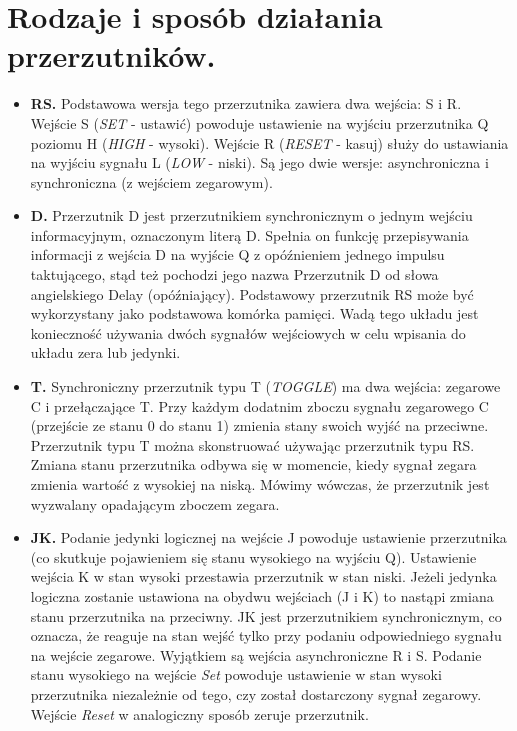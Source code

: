 \documentclass[12pt,a4paper]{article}
\begin{document}
	\section{Rodzaje i sposób działania przerzutników.}
	\begin{itemize}
		\item  \textbf{RS.} Podstawowa wersja tego przerzutnika zawiera dwa wejścia: S i R. Wejście S (\textit{SET} - ustawić) powoduje ustawienie na wyjściu przerzutnika Q poziomu H (\textit{HIGH} - wysoki). Wejście R (\textit{RESET} - kasuj) służy do ustawiania na wyjściu sygnału L (\textit{LOW} - niski).  Są jego dwie wersje: asynchroniczna i synchroniczna (z wejściem zegarowym).
		
		\item  \textbf{D.} Przerzutnik D jest przerzutnikiem synchronicznym o jednym wejściu informacyjnym, oznaczonym literą D. Spełnia on funkcję przepisywania informacji z wejścia D na wyjście Q z opóźnieniem jednego impulsu taktującego, stąd też pochodzi jego nazwa Przerzutnik D od słowa angielskiego Delay (opóźniający). Podstawowy przerzutnik RS może być wykorzystany jako podstawowa komórka pamięci. Wadą tego układu jest konieczność używania dwóch sygnałów wejściowych w celu wpisania do układu zera lub jedynki. 
		
		\item \textbf{T.} Synchroniczny przerzutnik typu T (\textit{TOGGLE}) ma dwa wejścia: zegarowe C i przełączające T. Przy każdym dodatnim zboczu sygnału zegarowego C (przejście ze stanu 0 do stanu 1) zmienia stany swoich wyjść na przeciwne. Przerzutnik typu T można skonstruować używając przerzutnik typu RS. Zmiana stanu przerzutnika odbywa się w momencie, kiedy sygnał zegara zmienia wartość z wysokiej na niską. Mówimy wówczas, że przerzutnik jest wyzwalany opadającym zboczem zegara.
		
		\item  \textbf{JK.} Podanie jedynki logicznej na wejście J powoduje ustawienie przerzutnika (co skutkuje pojawieniem się stanu wysokiego na wyjściu Q). Ustawienie wejścia K w stan wysoki przestawia przerzutnik w stan niski. Jeżeli jedynka logiczna zostanie ustawiona na obydwu wejściach (J i K) to nastąpi zmiana stanu przerzutnika na przeciwny.
		JK jest przerzutnikiem synchronicznym, co oznacza, że reaguje na stan wejść tylko przy podaniu odpowiedniego sygnału na wejście zegarowe. Wyjątkiem są wejścia asynchroniczne R i S. Podanie stanu wysokiego na wejście \textit{Set} powoduje ustawienie w stan wysoki przerzutnika niezależnie od tego, czy został dostarczony sygnał zegarowy. Wejście \textit{Reset} w analogiczny sposób zeruje przerzutnik.
	\end{itemize}
\end{document}
